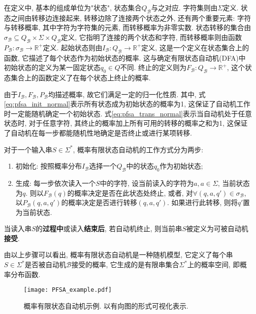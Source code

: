         在定义中, 基本的组成单位为"状态", 状态集合$Q_{\mathcal{B}}$与之对应. 字符集则由$\Sigma$定义. 状态之间由转移边连接起来, 转移边除了连接两个状态之外, 还有两个重要元素: 字符与转移概率, 其中字符为字符集的元素, 而转移概率为非零实数. 状态转移的集合由$\sigma_{\mathcal{B}} \subseteq Q_{\mathcal{B}} \times \Sigma \times Q_{\mathcal{B}}$定义, 它指明了连接的两个状态和字符, 而转移概率则由函数$P_{\mathcal{B}} : \sigma_{\mathcal{B}} \to \mathbb{R}^{+}$定义. 起始状态则由$I_{\mathcal{B}} : Q_{\mathcal{B}} \to \mathbb{R}^{+}$定义, 这是一个定义在状态集合上的函数, 它描述了每个状态作为初始状态的概率. 这与确定有限状态自动机(DFA)中初始状态的定义为某一固定状态$q_0 \in Q$不同. 终止的定义则为$F_{\mathcal{B}}: Q_{\mathcal{B}} \to \mathbb{R}^{+}$, 这个状态集合上的函数定义了在每个状态上终止的概率.
        
        由于$I_\mathcal{B}, F_\mathcal{B}, P_\mathcal{B}$均描述概率, 故它们满足一定的归一化性质. 其中, 式\ref{eq:pfsa_init_normal}表示所有状态成为初始状态的概率为1, 这保证了自动机工作时一定能随机确定一个初始状态. 式\ref{eq:pfsa_trans_normal}表示当自动机处于任意状态时, 对于任意字符, 其终止的概率加上所有可用的转移的概率之和为1, 这保证了自动机在每一步都能随机性地确定是否终止或进行某项转移.
        
        对于一个输入串$S \in \Sigma^{*}$, 概率有限状态自动机的工作方式分为两步:
        \begin{enumerate}
            \item 初始化: 按照概率分布$I_\mathcal{B}$选择一个$Q_{\mathcal{B}}$中的状态$q_0$作为初始状态;
            
            \item 生成: 每一步依次读入一个$S$中的字符, 设当前读入的字符为$a, a \in \Sigma$, 当前状态为$q$. 则以$F_{\mathcal{B}}(q)$的概率决定是否在此状态处终止, 或者, 对$\forall (q, a, q') \in \sigma_{\mathcal{B}}$, 以$P_{\mathcal{B}}(q, a, q')$的概率决定是否进行转移$(q,a,q')$. 如果进行此转移, 则将$q'$置为当前状态.
        \end{enumerate}
        当读入串$S$的\textbf{过程中}或读入\textbf{结束后}, 若自动机终止, 则当前串$S$被定义为可被自动机\textbf{接受}.
        
        由以上步骤可以看出, 概率有限状态自动机是一种随机模型, 它定义了每个串$S \in \Sigma^{*}$是否被自动机$\mathcal{B}$接受的概率, 它生成的是有限串集合$\Sigma^{*}$上的概率空间, 即概率分布函数.
        
        \begin{figure}[!htb]
            \centering
            \texttt{[image: PFSA\_example.pdf]}
            \caption[概率有限状态自动机示例]{概率有限状态自动机示例. 以有向图的形式可视化表示.}
            \label{fig:PFSA_example}
        \end{figure}
        
